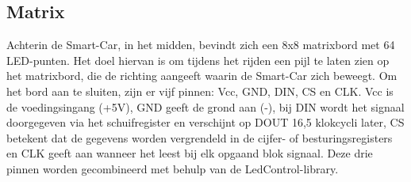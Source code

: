 \subsection{Matrix}
Achterin de \gls{Smart-Car}, in het midden, bevindt zich een 8x8 matrixbord met 64 LED-punten. Het doel hiervan is om tijdens het rijden een pijl te laten zien op het matrixbord, die de richting aangeeft waarin de \gls{Smart-Car} zich beweegt. Om het bord aan te sluiten, zijn er vijf pinnen: Vcc, GND, DIN, CS en CLK. Vcc is de voedingsingang (+5V), GND geeft de grond aan (-), bij DIN wordt het signaal doorgegeven via het schuifregister en verschijnt op DOUT 16,5 klokcycli later, CS betekent dat de gegevens worden vergrendeld in de cijfer- of besturingsregisters en CLK geeft aan wanneer het leest bij elk opgaand blok signaal. Deze drie pinnen worden gecombineerd met behulp van de LedControl-library.

